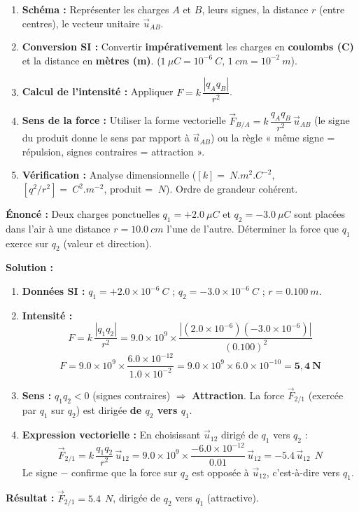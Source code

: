\documentclass[11pt]{article}
\begin{document}
\begin{methode}
\begin{enumerate}
    \item \textbf{Schéma :} Représenter les charges $A$ et $B$, leurs signes, la distance $r$ (entre centres), le vecteur unitaire $\vec{u}_{AB}$.
    \item \textbf{Conversion SI :} Convertir \textbf{impérativement} les charges en \textbf{coulombs (C)} et la distance en \textbf{mètres (m)}. ($1\ \mu C = 10^{-6}\ C$, $1\ cm = 10^{-2}\ m$).
    \item \textbf{Calcul de l'intensité :} Appliquer $F = k\,\dfrac{|q_A q_B|}{r^2}$.
    \item \textbf{Sens de la force :} Utiliser la forme vectorielle $\vec{F}_{B/A} = k\,\dfrac{q_A q_B}{r^2}\,\vec{u}_{AB}$ (le signe du produit donne le sens par rapport à $\vec{u}_{AB}$) ou la règle « même signe = répulsion, signes contraires = attraction ».
    \item \textbf{Vérification :} Analyse dimensionnelle ($[k] = \SI{}{N.m^2.C^{-2}}$, $[q^2/r^2] = \SI{}{C^2.m^{-2}}$, produit = $\SI{}{N}$). Ordre de grandeur cohérent.
\end{enumerate}
\end{methode}

\begin{exemplebox}
\textbf{Énoncé :} Deux charges ponctuelles $q_1 = +\num{2,0}\ \mu C$ et $q_2 = -\num{3,0}\ \mu C$ sont placées dans l'air à une distance $r = \num{10,0}\ cm$ l'une de l'autre. Déterminer la force que $q_1$ exerce sur $q_2$ (valeur et direction).

\textbf{Solution :}
\begin{enumerate}
    \item \textbf{Données SI :}
    $q_1 = +\num{2,0} \times 10^{-6}\ C$ ; $q_2 = -\num{3,0} \times 10^{-6}\ C$ ; $r = \num{0,100}\ m$.
    \item \textbf{Intensité :}
    \[
    F = k\,\frac{|q_1 q_2|}{r^2} = \num{9,0} \times 10^9 \times \frac{|(\num{2,0} \times 10^{-6})(\num{-3,0} \times 10^{-6})|}{(\num{0,100})^2}
    \]
    \[
    F = \num{9,0} \times 10^9 \times \frac{\num{6,0} \times 10^{-12}}{\num{1,0} \times 10^{-2}} = \num{9,0} \times 10^9 \times \num{6,0} \times 10^{-10} = \mathbf{5,4\ N}
    \]
    \item \textbf{Sens :} $q_1 q_2 < 0$ (signes contraires) $\Rightarrow$ \textbf{Attraction}.
    La force $\vec{F}_{2/1}$ (exercée par $q_1$ sur $q_2$) est dirigée \textbf{de $q_2$ vers $q_1$}.
    \item \textbf{Expression vectorielle :} En choisissant $\vec{u}_{12}$ dirigé de $q_1$ vers $q_2$ :
    \[
    \vec{F}_{2/1} = k\,\frac{q_1 q_2}{r^2}\,\vec{u}_{12} = \num{9,0} \times 10^9 \times \frac{-\num{6,0} \times 10^{-12}}{\num{0,01}}\,\vec{u}_{12} = -\num{5,4}\,\vec{u}_{12}\ \SI{}{N}
    \]
    Le signe $-$ confirme que la force sur $q_2$ est opposée à $\vec{u}_{12}$, c'est-à-dire vers $q_1$.
\end{enumerate}
\textbf{Résultat :} $\vec{F}_{2/1} = \num{5,4}\ \SI{}{N}$, dirigée de $q_2$ vers $q_1$ (attractive).
\end{exemplebox}
\end{document}
